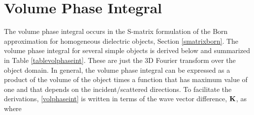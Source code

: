\section{Volume Phase Integral}
\label{sec:volumephaseint}
The volume phase integral occurs in the S-matrix formulation of the  Born approximation for homogeneous dielectric objects, Section \ref{smatrixborn}.  The volume phase integral for several simple objects is derived below and summarized in Table \ref{tablevolphaseint}. These are just the 3D Fourier transform over the object domain. In general, the volume phase integral can be expressed as a product of the volume of the object times a function that has maximum value of one and that depends on the incident/scattered directions. To facilitate the derivations, \eqref{volphaseint} is written in terms of the wave vector difference, $\mathbf{K}$, as 
\noindent where
\vspace{-7mm}


